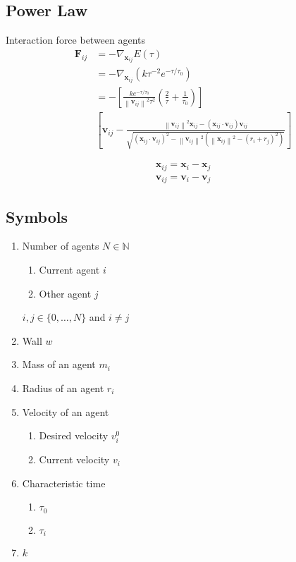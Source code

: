 \subsection{Power Law}
Interaction force between agents
\begin{align}
\mathbf{F}_{ij} &= -\nabla_{\mathbf{x}_{ij}} E(\tau) \\
&= -\nabla_{\mathbf{x}_{ij}} \left(k \tau^{-2} e^{-\tau / \tau_{0}} \right)
\\
&= - \left[\frac{k e^{-\tau / \tau_{0}}}{\left\|\mathbf{v}_{ij}\right\|^{2} \tau^{2}} \left(\frac{2}{\tau} + \frac{1}{\tau_{0}}\right) \right] 
\\
&\left[ \mathbf{v}_{ij} - \frac{\left\|\mathbf{v}_{ij}\right\|^{2} \mathbf{x}_{ij} - \left(\mathbf{x}_{ij}\cdot\mathbf{v}_{ij}\right) \mathbf{v}_{ij} }{\sqrt{\left(\mathbf{x}_{ij}\cdot\mathbf{v}_{ij}\right)^{2} - \left\|\mathbf{v}_{ij}\right\|^{2} \left( \left\|\mathbf{x}_{ij}\right\|^{2} - \left(r_{i} + r_{j}\right)^{2} \right) }} \right]
\end{align}

\begin{align}
\mathbf{x}_{ij} = \mathbf{x}_{i} - \mathbf{x}_{j} \\
\mathbf{v}_{ij} = \mathbf{v}_{i} - \mathbf{v}_{j}
\end{align}

\subsection{Symbols}
\begin{enumerate}
\item Number of agents $ N \in \mathbb{N} $
\begin{enumerate}
\item Current agent $ i $
\item Other agent $ j $
\end{enumerate}
$ i,j \in \{0, \ldots, N\} $ and $ i \neq j $

\item 
Wall $ w $

\item 
Mass of an agent $ m_{i} $

\item 
Radius of an agent $ r_{i} $

\item 
Velocity of an agent
\begin{enumerate}
\item Desired velocity $ v_{i}^{0} $
\item Current velocity $ v_{i} $
\end{enumerate}

\item 
Characteristic time 
\begin{enumerate}
\item $ \tau_{0} $
\item $ \tau_{i} $
\end{enumerate}

\item 
$ k $

\end{enumerate}
